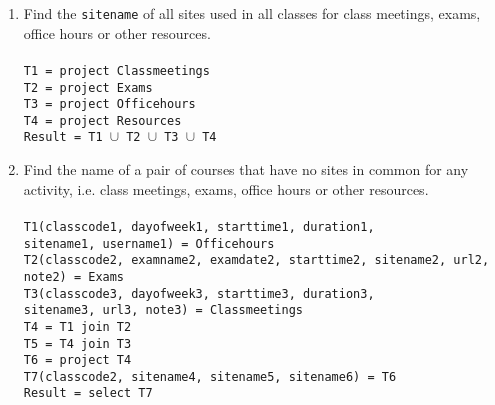 \documentclass[11pt]{article}
\begin{document}
\begin{enumerate} [label=\Alph*]
\item Find the {\tt sitename} of all sites used in all classes for
  class meetings, exams, office hours or other resources.\\\\
\texttt{T1 = project Classmeetings} \\
\texttt{T2 = project Exams} \\
\texttt{T3 = project Officehours} \\
\texttt{T4 = project Resources} \\
\texttt{Result = T1 $\cup$ T2 $\cup$ T3 $\cup$ T4}


\item Find the name of a pair of courses that have no sites in common
  for any activity, i.e. class meetings, exams, office hours or other
  resources. \\\\
 \texttt{T1(classcode1, dayofweek1, starttime1, duration1, \\sitename1, username1) = Officehours} \\
 \texttt{T2(classcode2, examname2, examdate2, starttime2, sitename2, url2, note2) = Exams} \\
 \texttt{T3(classcode3, dayofweek3, starttime3, duration3, \\sitename3, url3, note3) = Classmeetings} \\
 \texttt{T4 = T1 join T2}  \\
 \texttt{T5 = T4 join T3}  \\
 \texttt{T6 = project T4} \\
 \texttt{T7(classcode2, sitename4, sitename5, sitename6) = T6} \\ 
 \texttt{Result = select T7}
 

\end{enumerate}
\end{document}
